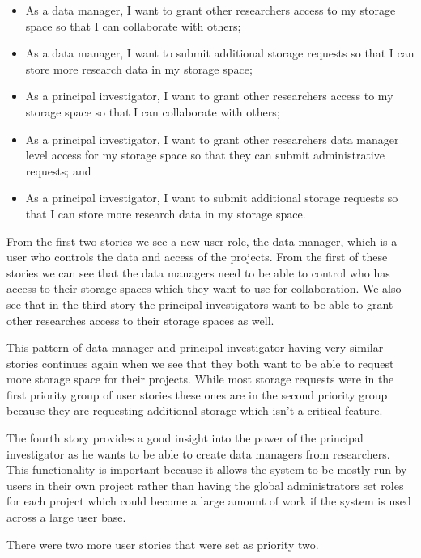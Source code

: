 \documentclass[a4paper,titlepage,12pt]{article}
\begin{document}
\begin{itemize}
	\item As a data manager, I want to grant other researchers access to my
	      storage space so that I can collaborate with others;
	\item As a data manager, I want to submit additional storage requests
	      so that I can store more research data in my storage space;
	\item As a principal investigator, I want to grant other researchers
	      access to my storage space so that I can collaborate with others;
	\item As a principal investigator, I want to grant other researchers
	      data manager level access for my storage space so that they can
	      submit administrative requests; and
	\item As a principal investigator, I want to submit additional storage
	      requests so that I can store more research data in my storage
	      space.
\end{itemize}

From the first two stories we see a new user role, the data manager, which is a
user who controls the data and access of the projects. From the first of these
stories we can see that the data managers need to be able to control who has
access to their storage spaces which they want to use for collaboration. We
also see that in the third story the principal investigators want to be able to
grant other researches access to their storage spaces as well.

This pattern of data manager and principal investigator having very similar
stories continues again when we see that they both want to be able to request
more storage space for their projects. While most storage requests were in the
first priority group of user stories these ones are in the second priority
group because they are requesting additional storage which isn't a critical
feature.

The fourth story provides a good insight into the power of the principal
investigator as he wants to be able to create data managers from researchers.
This functionality is important because it allows the system to be mostly run
by users in their own project rather than having the global administrators set
roles for each project which could become a large amount of work if the system
is used across a large user base.

There were two more user stories that were set as priority two.
\end{document}
